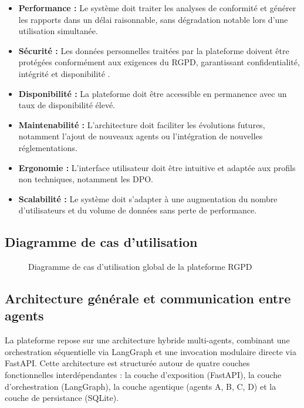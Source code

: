 \documentclass[12pt,a4paper]{report}
\begin{document}
\begin{itemize}[leftmargin=*, label=\textbullet]
    \item \textbf{Performance :} Le système doit traiter les analyses de conformité et générer les rapports dans un délai raisonnable, sans dégradation notable lors d'une utilisation simultanée.
    \item \textbf{Sécurité :} Les données personnelles traitées par la plateforme doivent être protégées conformément aux exigences du RGPD, garantissant confidentialité, intégrité et disponibilité \cite{rgpd}.
    \item \textbf{Disponibilité :} La plateforme doit être accessible en permanence avec un taux de disponibilité élevé.
    \item \textbf{Maintenabilité :} L'architecture doit faciliter les évolutions futures, notamment l'ajout de nouveaux agents ou l'intégration de nouvelles réglementations.
    \item \textbf{Ergonomie :} L'interface utilisateur doit être intuitive et adaptée aux profils non techniques, notamment les DPO.
    \item \textbf{Scalabilité :} Le système doit s'adapter à une augmentation du nombre d'utilisateurs et du volume de données sans perte de performance.
\end{itemize}

\subsection{Diagramme de cas d'utilisation}

\begin{figure}[H]
\centering
{}
\caption{Diagramme de cas d'utilisation global de la plateforme RGPD}
\label{fig:use_case_global}
\end{figure}

\subsection{Architecture générale et communication entre agents}

La plateforme repose sur une architecture hybride multi-agents, combinant une orchestration séquentielle via LangGraph et une invocation modulaire directe via FastAPI. Cette architecture est structurée autour de quatre couches fonctionnelles interdépendantes : la couche d'exposition (FastAPI), la couche d'orchestration (LangGraph), la couche agentique (agents A, B, C, D) et la couche de persistance (SQLite).
\end{document}
